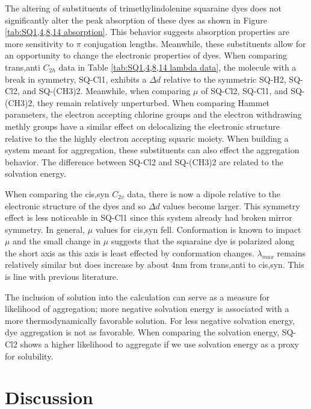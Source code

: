 \documentclass[journal=jacsat,manuscript=article]{achemso}
\begin{document}
\newpage
The altering of substituents of trimethylindolenine squaraine dyes does not significantly alter the peak absorption of these dyes as shown in Figure \ref{tab:SQ1,4,8,14 absorption}. This behavior suggests absorption properties are more sensitivity to $\pi$ conjugation lengths\cite{Yamaguchi2008HowEfficiency}. Meanwhile, these substituents allow for an opportunity to change the electronic properties of dyes. When comparing trans,anti $C_{2h}$ data in Table \ref{tab:SQ1,4,8,14 lambda data}, the molecule with a break in symmetry, SQ-Cl1, exhibits a $\Delta d$ relative to the symmetric SQ-H2, SQ-Cl2, and SQ-(CH3)2. Meanwhile, when comparing $\mu$ of SQ-Cl2, SQ-Cl1, and SQ-(CH3)2, they remain relatively unperturbed. When comparing Hammet parameters, the electron accepting chlorine groups and the electron withdrawing methly groups have a similar effect on delocalizing the electronic structure relative to the the highly electron accepting squaric moiety.
When building a system meant for aggregation, these substituents can also effect the aggregation behavior. The difference between SQ-Cl2 and SQ-(CH3)2 are related to the solvation energy.

When comparing the cis,syn $C_{2v}$ data, there is now a dipole relative to the electronic structure of the dyes and so $\Delta d$ values become larger. This symmetry effect is less noticeable in SQ-Cl1 since this system already had broken mirror symmetry. In general, $\mu$ values for cis,syn fell. Conformation is known to impact $\mu$\cite{Brand2011HowStructure} and the small change in $\mu$ suggests that the squaraine dye is polarized along the short axis as this axis is least effected by conformation changes\cite{Lopata2011Excited-stateTD-ZINDO}. $\lambda_{max}$ remains relatively similar but does increase by about 4nm from trans,anti to cis,syn. This is line with previous literature\cite{Borrelli2014TheoreticalDye}.

The inclusion of solution into the calculation can serve as a measure for likelihood of aggregation; more negative solvation energy is associated with a more thermodynamically favorable solution. For less negative solvation energy, dye aggregation is not as favorable. When comparing the solvation energy, SQ-Cl2 shows a higher likelihood to aggregate if we use solvation energy as a proxy for solubility\cite{Fothergill2018AbDyes}. 
\newpage
\newpage
\section{Discussion}
\end{document}
